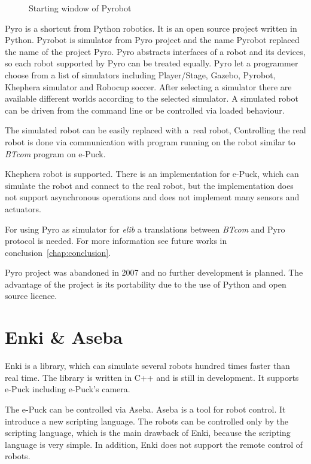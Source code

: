 \begin{figure}[!hbp]
\begin{picture}
    \end{picture}%
  \fi
  \caption{\label{pic:pyrobot_win}%
   Starting window of Pyrobot}
  \end{figure}



  Pyro is a shortcut from Python robotics. It is an open source project written in Python. 
  Pyrobot is simulator from Pyro project and the name Pyrobot replaced the name of the project Pyro. 
  Pyro abstracts interfaces of a robot and
  its devices, so each robot supported by Pyro can be treated equally.
  Pyro let a programmer choose from a list of simulators including Player/Stage, Gazebo, Pyrobot, Khephera simulator
  and Robocup soccer.
  After selecting a simulator there are available different worlds according to the selected simulator.
  A simulated robot can be driven from the command line or be controlled via loaded behaviour.
  
  The simulated robot can be easily replaced with a~real robot, 
  Controlling the real robot is done via communication with program running on the robot similar 
  to {\it BTcom} program on e-Puck.
  
  Khephera robot is supported. There is an implementation for e-Puck, which can simulate the robot
  and connect to the real robot, but the implementation does not support asynchronous operations 
  and does not implement many sensors and actuators.
  
  For using Pyro as simulator for {\it elib} a translations between {\it BTcom} 
  and Pyro protocol is needed.
  For more information see future works in conclusion~\ref{chap:conclusion}.	
  
  Pyro project was abandoned in 2007 and no further development is planned.
  The advantage of the project is its portability due to the use of Python and open source licence.
\section{Enki \& Aseba\cite{enki}}
  Enki is a library, which can simulate several robots hundred times faster than real time.
  The library is written in C++ and is still in development. It supports e-Puck including e-Puck's camera. 
  
  The e-Puck can be controlled via Aseba. Aseba is a tool for robot control.
  It introduce a new scripting language. 
  The robots can be controlled only by the scripting language, which is the main
  drawback of Enki, because the scripting language is very simple.
  In addition, Enki does not support the remote control of robots.
